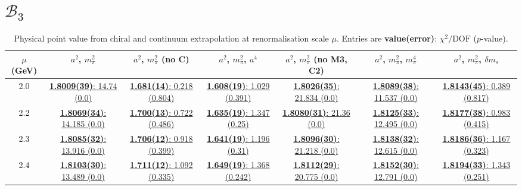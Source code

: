 \documentclass[12pt]{extarticle}
\begin{document}
\section{$\mathcal{B}_3$}
\begin{table}[h!]
\begin{center}
\begin{tabular}{|c|c|c|c|c|c|c|}
\hline
$\mu$ (GeV) & $a^2$, $m_\pi^2$& $a^2$, $m_\pi^2$ (no C)& $a^2$, $m_\pi^2$, $a^4$& $a^2$, $m_\pi^2$ (no M3, C2)& $a^2$, $m_\pi^2$, $m_\pi^4$& $a^2$, $m_\pi^2$, $\delta m_s$\\
\hline
2.0& \hyperlink{SSmPP/NPR/bag_a2m2_20.pdf.1}{\textbf{1.8009(39)}: 14.74 (0.0)} & \hyperlink{SSmPP/NPR/bag_a2m2noC_20.pdf.1}{\textbf{1.681(14)}: 0.218 (0.804)} & \hyperlink{SSmPP/NPR/bag_a2a4m2_20.pdf.1}{\textbf{1.608(19)}: 1.029 (0.391)} & \hyperlink{SSmPP/NPR/bag_a2m2mcut_20.pdf.1}{\textbf{1.8026(35)}: 21.834 (0.0)} & \hyperlink{SSmPP/NPR/bag_a2m2m4_20.pdf.1}{\textbf{1.8089(38)}: 11.537 (0.0)} & \hyperlink{SSmPP/NPR/bag_a2m2delm_20.pdf.1}{\textbf{1.8143(45)}: 0.389 (0.817)}\\
2.2& \hyperlink{SSmPP/NPR/bag_a2m2_22.pdf.1}{\textbf{1.8069(34)}: 14.185 (0.0)} & \hyperlink{SSmPP/NPR/bag_a2m2noC_22.pdf.1}{\textbf{1.700(13)}: 0.722 (0.486)} & \hyperlink{SSmPP/NPR/bag_a2a4m2_22.pdf.1}{\textbf{1.635(19)}: 1.347 (0.25)} & \hyperlink{SSmPP/NPR/bag_a2m2mcut_22.pdf.1}{\textbf{1.8080(31)}: 21.36 (0.0)} & \hyperlink{SSmPP/NPR/bag_a2m2m4_22.pdf.1}{\textbf{1.8125(33)}: 12.495 (0.0)} & \hyperlink{SSmPP/NPR/bag_a2m2delm_22.pdf.1}{\textbf{1.8177(38)}: 0.983 (0.415)}\\
2.3& \hyperlink{SSmPP/NPR/bag_a2m2_23.pdf.1}{\textbf{1.8085(32)}: 13.916 (0.0)} & \hyperlink{SSmPP/NPR/bag_a2m2noC_23.pdf.1}{\textbf{1.706(12)}: 0.918 (0.399)} & \hyperlink{SSmPP/NPR/bag_a2a4m2_23.pdf.1}{\textbf{1.641(19)}: 1.196 (0.31)} & \hyperlink{SSmPP/NPR/bag_a2m2mcut_23.pdf.1}{\textbf{1.8096(30)}: 21.218 (0.0)} & \hyperlink{SSmPP/NPR/bag_a2m2m4_23.pdf.1}{\textbf{1.8138(32)}: 12.615 (0.0)} & \hyperlink{SSmPP/NPR/bag_a2m2delm_23.pdf.1}{\textbf{1.8186(36)}: 1.167 (0.323)}\\
2.4& \hyperlink{SSmPP/NPR/bag_a2m2_24.pdf.1}{\textbf{1.8103(30)}: 13.489 (0.0)} & \hyperlink{SSmPP/NPR/bag_a2m2noC_24.pdf.1}{\textbf{1.711(12)}: 1.092 (0.335)} & \hyperlink{SSmPP/NPR/bag_a2a4m2_24.pdf.1}{\textbf{1.649(19)}: 1.368 (0.242)} & \hyperlink{SSmPP/NPR/bag_a2m2mcut_24.pdf.1}{\textbf{1.8112(29)}: 20.775 (0.0)} & \hyperlink{SSmPP/NPR/bag_a2m2m4_24.pdf.1}{\textbf{1.8152(30)}: 12.791 (0.0)} & \hyperlink{SSmPP/NPR/bag_a2m2delm_24.pdf.1}{\textbf{1.8194(33)}: 1.343 (0.251)}\\
\hline
\end{tabular}
\caption{Physical point value from chiral and continuum extrapolation at renormalisation scale $\mu$. Entries are \textbf{value(error)}: $\chi^2/\text{DOF}$ ($p$-value).}
\end{center}
\end{table}
\end{document}

